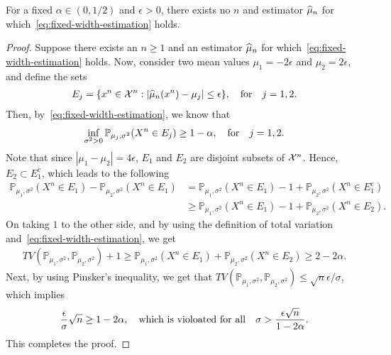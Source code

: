 \documentclass[12pt]{article}
\begin{document}
\begin{proposition}
    \label{prop:impossibility-fixed-width-estimation} For a fixed $\alpha \in (0,1/2)$ and $\epsilon>0$, there exists no $n$ and estimator $\widehat{\mu}_n$ for which~\eqref{eq:fixed-width-estimation} holds. 
\end{proposition}
\begin{proof}
    Suppose there exists an $n \geq 1$ and an estimator $\widehat{\mu}_n$ for which~\eqref{eq:fixed-width-estimation} holds. Now, consider two mean values $\mu_1 = -2\epsilon$ and $\mu_2 = 2\epsilon$, and define the sets 
    \begin{align}
        E_j = \{x^n \in {\cal X}^n: |\widehat{\mu}_n(x^n) - \mu_j| \leq \epsilon \}, \quad \text{for} \quad j= 1,2. 
    \end{align}
    Then, by~\eqref{eq:fixed-width-estimation}, we know that 
    \begin{align}
        \inf_{\sigma^2>0} \mathbb{P}_{\mu_j, \sigma^2}(X^n \in E_j) \geq 1-\alpha, \quad \text{for} \quad j= 1, 2.
    \end{align}
    Note that since $|\mu_1 - \mu_2| = 4 \epsilon$,  $E_1$ and $E_2$ are disjoint subsets of ${\cal X}^n$. 
    Hence, $E_2 \subset E_1^c$, which leads to the following 
    \begin{align}
        \mathbb{P}_{\mu_1, \sigma^2}(X^n \in E_1) - \mathbb{P}_{\mu_2, \sigma^2}(X^n \in E_1) &= \mathbb{P}_{\mu_1, \sigma^2}(X^n \in E_1) - 1 +  \mathbb{P}_{\mu_2, \sigma^2}(X^n \in E_1^c) \\
        & \geq \mathbb{P}_{\mu_1, \sigma^2}(X^n \in E_1) - 1 +  \mathbb{P}_{\mu_2, \sigma^2}(X^n \in E_2). 
    \end{align}
    On taking $1$ to the other side, and by using the definition of total variation and~\eqref{eq:fixed-width-estimation}, we get 
    \begin{align}
        TV(\mathbb{P}_{\mu_1, \sigma^2}, \mathbb{P}_{\mu_2, \sigma^2}) + 1 \geq \mathbb{P}_{\mu_1, \sigma^2}(X^n \in E_1)  +  \mathbb{P}_{\mu_2, \sigma^2}(X^n \in E_2) \geq 2 - 2\alpha. 
    \end{align}
    Next, by using Pinsker's inequality, we get that $TV(\mathbb{P}_{\mu_1, \sigma^2}, \mathbb{P}_{\mu_2, \sigma^2}) \leq \sqrt{n}\epsilon/\sigma$, which implies 
    \begin{align}
        \frac{\epsilon}{\sigma} \sqrt{n} \geq 1 - 2\alpha, \quad \text{which is violoated for all} \quad \sigma > \frac{\epsilon \sqrt{n}}{1 - 2\alpha}.
    \end{align}
    This completes the proof. 
\end{proof}
\end{document}
